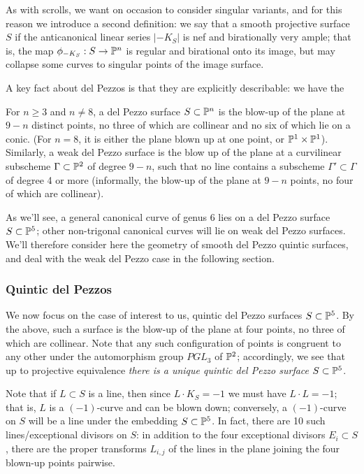 As with scrolls, we want on occasion to consider singular variants, and for this reason we introduce a second definition: we say that a smooth projective surface $S$ if the anticanonical linear series $|-K_S|$ is nef and birationally very ample; that is, the map $\phi_{-K_S} : S \to {\mathbb P}^n$ is regular and birational onto its image, but may collapse some curves to singular points of the image surface. 

A key fact about del Pezzos is that they are explicitly describable: we have the

\begin{proposition}
For $n \geq 3$ and $n \neq 8$, a del Pezzo surface $S \subset {\mathbb P}^n$ is the blow-up of the plane at $9-n$ distinct points, no three of which are collinear and no six of which lie on a conic. (For $n=8$, it is either the plane blown up at one point, or ${\mathbb P}^1 \times {\mathbb P}^1$). Similarly, a weak del Pezzo surface is the blow up of the plane at a curvilinear subscheme $\Gamma \subset {\mathbb P}^2$ of degree $9-n$, such that no line contains a subscheme $\Gamma' \subset \Gamma$ of degree 4 or more (informally, the blow-up of the plane at $9-n$ points, no four of which are collinear).
\end{proposition}

As we'll see, a general canonical curve of genus 6 lies on a del Pezzo surface $S \subset {\mathbb P}^5$; other non-trigonal canonical curves will lie on weak del Pezzo surfaces. We'll therefore consider here the geometry of smooth del Pezzo quintic surfaces, and deal with the weak del Pezzo case in the following section.

\subsubsection{Quintic del Pezzos}

We now focus on the case of interest to us, quintic del Pezzo surfaces $S \subset {\mathbb P}^5$. By the above, such a surface is the blow-up of the plane at four points, no three of which are collinear. Note that any such configuration of points is congruent to any other under the automorphism group $PGL_3$ of ${\mathbb P}^2$; accordingly, we see that up to projective equivalence \emph{there is a unique quintic del Pezzo surface $S \subset {\mathbb P}^5$}.

Note that if $L \subset S$ is a line, then since $L \cdot K_S = -1$ we must have $L\cdot L = -1$; that is, $L$ is a $(-1)$-curve and can be blown down; conversely, a $(-1)$-curve on $S$ will be a line under the embedding $S \subset {\mathbb P}^5$. In fact, there are 10 such lines/exceptional divisors on $S$: in addition to the four exceptional divisors $E_i \subset S$, there are the proper transforms $L_{i,j}$ of the lines in the plane joining the four blown-up points pairwise.

